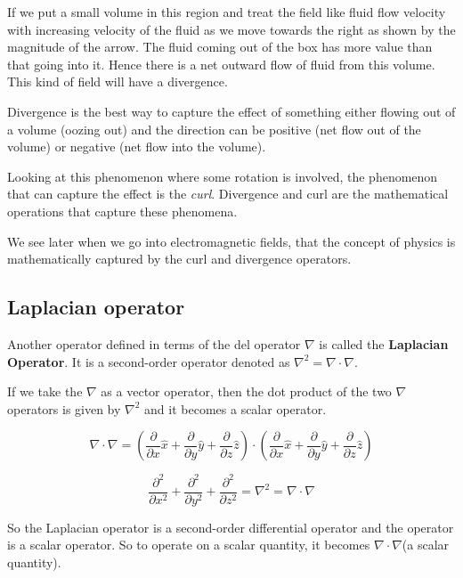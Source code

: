 If we put a small volume in this region and treat the field like fluid flow velocity with increasing velocity of the fluid as we move towards the right as shown by the magnitude of the arrow. The fluid coming out of the box has more value than that going into it. Hence there is a net outward flow of fluid from this volume. This kind of field will have a divergence.

Divergence is the best way to capture the effect of something either flowing out of a volume (oozing out) and the direction can be positive (net flow out of the volume) or negative (net flow into the volume).

Looking at this phenomenon where some rotation is involved, the phenomenon that can capture the effect is the \textit{curl}. Divergence and curl are the mathematical operations that capture these phenomena.

We see later when we go into electromagnetic fields, that the concept of physics is mathematically captured by the curl and divergence operators.

\subsection{Laplacian operator}
Another operator defined in terms of the del operator $\nabla$ is called the \textbf{Laplacian Operator}. It is a second-order operator denoted as $\nabla^2 = \nabla \cdot \nabla$.

If we take the $\nabla$ as a vector operator, then the dot product of the two $\nabla$ operators is given by $\nabla^2$ and it becomes a scalar operator.

\begin{dmath}
\nabla \cdot \nabla =  \left(\frac{\partial  }{\partial x}\hat x + \frac{\partial  }{\partial y}\hat y + \frac{\partial  }{\partial z}\hat z \right) \cdot \left( \frac{\partial  }{\partial x}\hat x + \frac{\partial  }{\partial y}\hat y + \frac{\partial  }{\partial z}\hat z\right)
\end{dmath}

\begin{dmath}
\frac{\partial^{2}  }{\partial x^{2}} + \frac{\partial^{2}  }{\partial y^{2}} + \frac{\partial^{2}  }{\partial z^{2}}= \nabla^{2} = \nabla \cdot \nabla
\end{dmath}

So the Laplacian operator is a second-order differential operator and the operator is a scalar operator. So to operate on a scalar quantity, it becomes $\nabla\cdot\nabla$(a scalar quantity).

